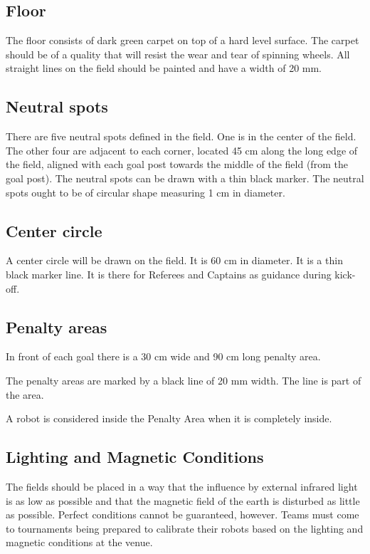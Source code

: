 \documentclass{article}
\begin{document}
\subsection{ Floor \label{ref-033}}

The floor consists of dark green carpet on top of a hard level surface. The carpet should be of a quality that will resist the wear and tear of spinning wheels. All straight lines on the field should be painted and have a width of 20 mm.

\subsection{ Neutral spots \label{ref-034}}

There are five neutral spots defined in the field. One is in the center of the field. The other four are adjacent to each corner, located 45 cm along the long edge of the field, aligned with each goal post towards the middle of the field (from the goal post). The neutral spots can be drawn with a thin black marker. The neutral spots ought to be of circular shape measuring 1 cm in diameter.

\subsection{ Center circle \label{ref-035}}

A center circle will be drawn on the field. It is 60 cm in diameter. It is a thin black marker line. It is there for Referees and Captains as guidance during kick-off.

\subsection{ Penalty areas \label{ref-036}}

In front of each goal there is a 30 cm wide and 90 cm long penalty area.

The penalty areas are marked by a black line of 20 mm width. The line is part of the area.

A robot is considered inside the Penalty Area when it is completely inside.

\textbf{}

\subsection{ Lighting and Magnetic Conditions \label{ref-037}}

The fields should be placed in a way that the influence by external infrared light is as low as possible and that the magnetic field of the earth is disturbed as little as possible. Perfect conditions cannot be guaranteed, however. Teams must come to tournaments being prepared to calibrate their robots based on the lighting and magnetic conditions at the venue.
\end{document}
